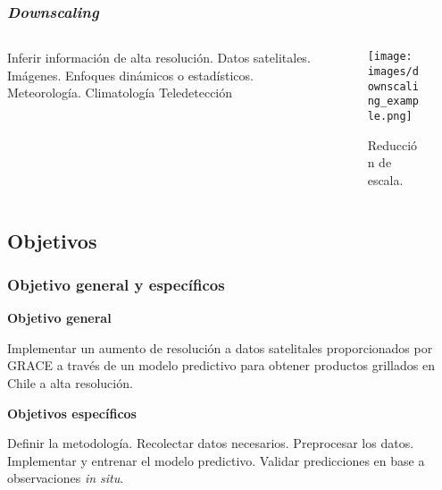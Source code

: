 \documentclass{beamer}
\begin{document}
  \begin{frame}
    \frametitle{\textit{Downscaling}}

    \begin{columns}

      \begin{column}{0.4\textwidth}
        \begin{outline}
          \1 Inferir información de alta resolución.
            \2 Datos satelitales.
            \2 Imágenes.
          \1 Enfoques dinámicos o estadísticos.
            \2 Meteorología.
            \2 Climatología
            \2 Teledetección
        \end{outline}
      \end{column}
      
      \begin{column}{0.6\textwidth}
        \begin{figure}
          \begin{center}
            \texttt{[image: images/downscaling\_example.png]}
          \end{center}
          \caption{Reducción de escala.}
        \end{figure}
      \end{column}
    \end{columns}
  \end{frame}

  \subsection*{Objetivos}

  \begin{frame}
    \frametitle{Objetivo general y específicos}

    \large\textbf{Objetivo general}
    \begin{outline}
      \1 Implementar un aumento de resolución a datos satelitales proporcionados por GRACE a través de un modelo
      predictivo para obtener productos grillados en Chile a alta resolución.
    \end{outline}

    \large\textbf{Objetivos específicos} 
    \begin{outline}
      \1 Definir la metodología.
      \1 Recolectar datos necesarios.
      \1 Preprocesar los datos.
      \1 Implementar y entrenar el modelo predictivo.
      \1 Validar predicciones en base a observaciones \textit{in situ}.
    \end{outline}

  \end{frame}
\end{document}
